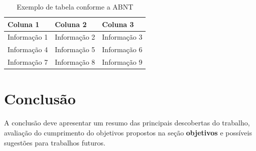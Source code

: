 \begin{table}[h]
    \centering
    \caption{Exemplo de tabela conforme a ABNT}
    \label{quad:exemplo}
    \begin{tabular}{p{3cm} p{4cm} p{3cm}}
        \hline%
        \textbf{Coluna 1} & \textbf{Coluna 2} & \textbf{Coluna 3} \\
        \hline%
        Informação 1 & Informação 2 & Informação 3 \\
        Informação 4 & Informação 5 & Informação 6 \\
        Informação 7 & Informação 8 & Informação 9 \\
        \hline%
    \end{tabular}
\end{table}

\chapter{Conclusão} \label{ch:conclusao}

A conclusão deve apresentar um resumo das principais descobertas do trabalho, avaliação do cumprimento do objetivos propostos na seção \textbf{objetivos} e possíveis sugestões para trabalhos futuros.